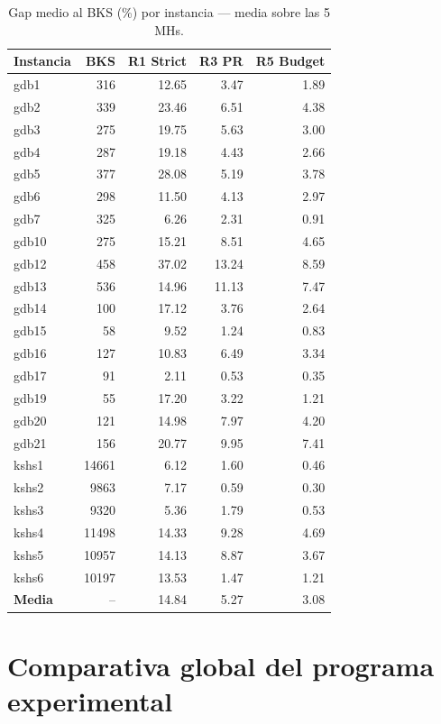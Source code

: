 \begin{table}[h]
\centering
\caption{Gap medio al BKS (\%) por instancia — media sobre las 5 MHs.}
\label{tab:re-greedy-inst}
\small
\begin{tabular}{lrrrr}
\toprule
Instancia & BKS & R1 Strict & R3 PR & R5 Budget \\
\midrule
gdb1  &  316 & 12.65 & 3.47 & 1.89 \\
gdb2  &  339 & 23.46 & 6.51 & 4.38 \\
gdb3  &  275 & 19.75 & 5.63 & 3.00 \\
gdb4  &  287 & 19.18 & 4.43 & 2.66 \\
gdb5  &  377 & 28.08 & 5.19 & 3.78 \\
gdb6  &  298 & 11.50 & 4.13 & 2.97 \\
gdb7  &  325 &  6.26 & 2.31 & 0.91 \\
gdb10 &  275 & 15.21 & 8.51 & 4.65 \\
gdb12 &  458 & 37.02 & 13.24 & 8.59 \\
gdb13 &  536 & 14.96 & 11.13 & 7.47 \\
gdb14 &  100 & 17.12 & 3.76 & 2.64 \\
gdb15 &   58 &  9.52 & 1.24 & 0.83 \\
gdb16 &  127 & 10.83 & 6.49 & 3.34 \\
gdb17 &   91 &  2.11 & 0.53 & 0.35 \\
gdb19 &   55 & 17.20 & 3.22 & 1.21 \\
gdb20 &  121 & 14.98 & 7.97 & 4.20 \\
gdb21 &  156 & 20.77 & 9.95 & 7.41 \\
kshs1 & 14661 & 6.12 & 1.60 & 0.46 \\
kshs2 &  9863 & 7.17 & 0.59 & 0.30 \\
kshs3 &  9320 & 5.36 & 1.79 & 0.53 \\
kshs4 & 11498 & 14.33 & 9.28 & 4.69 \\
kshs5 & 10957 & 14.13 & 8.87 & 3.67 \\
kshs6 & 10197 & 13.53 & 1.47 & 1.21 \\
\midrule
\textbf{Media} & -- & 14.84 & 5.27 & 3.08 \\
\bottomrule
\end{tabular}
\end{table}

\section{Comparativa global del programa experimental}
\label{sec:comparativa-global}

